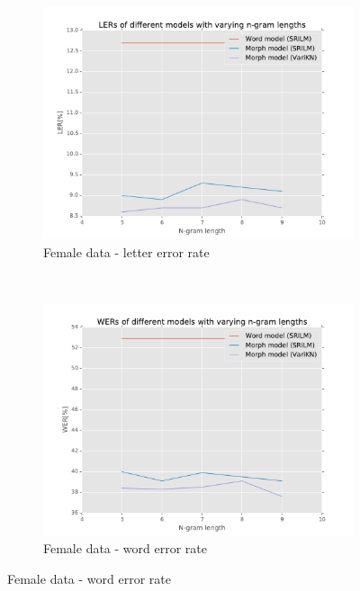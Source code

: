 \documentclass[b5paper]{article}
\begin{document}
\begin{figure}[h!]
\centering
\begin{subfigure}[b]{.4\textwidth}

\includegraphics[width=\textwidth]{figures/smeF-complete_wikipedia-ler}
\caption{Female data - letter error rate}
\end{subfigure}~
\begin{subfigure}[b]{.4\textwidth}
\includegraphics[width=\textwidth]{figures/smeF-complete_wikipedia-wer}
\caption{Female data - word error rate}
\end{subfigure}


\end{figure}
\end{document}
